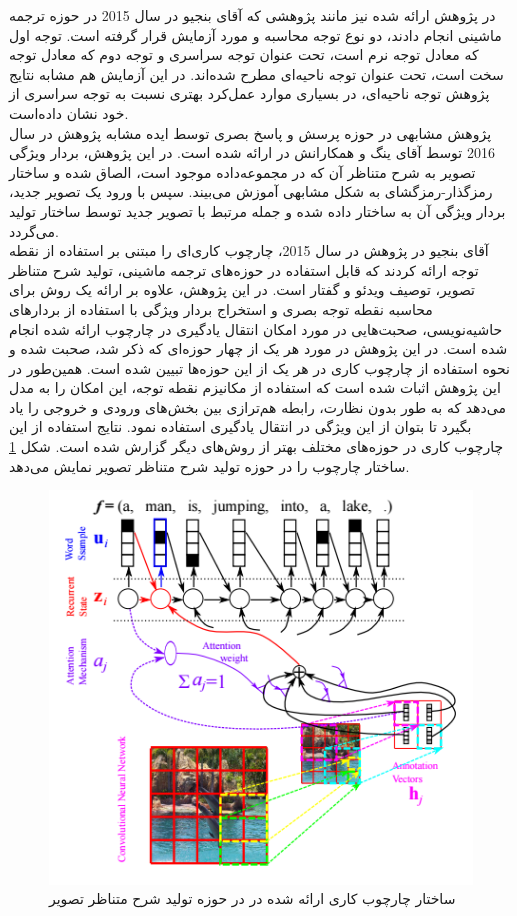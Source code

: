 در پژوهش ارائه شده نیز مانند پژوهشی که آقای بنجیو در سال 2015 در حوزه ترجمه ماشینی انجام دادند، دو نوع توجه محاسبه و مورد آزمایش قرار گرفته است. توجه اول که معادل توجه نرم است، تحت عنوان توجه سراسری و توجه دوم که معادل توجه سخت است، تحت عنوان توجه ناحیه‌ای مطرح شده‌اند. در این آزمایش هم مشابه نتایج پژوهش \cite{xu2015show} توجه ناحیه‌ای، در بسیاری موارد عمل‌کرد بهتری نسبت به توجه سراسری از خود نشان داده‌است.
\\
پژوهش مشابهی در حوزه پرسش و پاسخ بصری توسط ایده مشابه پژوهش \cite{luong2015effective} در سال 2016 توسط آقای ینگ و همکارانش در \cite{yang2016stacked} ارائه شده است. در این پژوهش، بردار ویژگی تصویر به شرح متناظر آن که در مجموعه‌داده موجود است، الصاق شده و ساختار رمزگذار-رمزگشای به شکل مشابهی آموزش می‌بیند. سپس با ورود یک تصویر جدید، بردار ویژگی آن به ساختار داده شده و جمله مرتبط با تصویر جدید توسط ساختار تولید می‌گردد.
\\
آقای بنجیو در پژوهش \cite{cho2015describing} در سال 2015، چارچوب کاری‌ای را مبتنی بر استفاده از نقطه توجه ارائه کردند که قابل استفاده در حوزه‌های ترجمه ماشینی، تولید شرح متناظر تصویر، توصیف ویدئو و گفتار است. در این پژوهش، علاوه بر ارائه یک روش برای محاسبه نقطه توجه بصری و استخراج بردار ویژگی با استفاده از بردارهای حاشیه‌نویسی، صحبت‌هایی در مورد امکان انتقال یادگیری در چارچوب ارائه شده انجام شده است. در این پژوهش در مورد هر یک از چهار حوزه‌ای که ذکر شد، صحبت شده و نحوه استفاده از چارچوب کاری در هر یک از این حوزه‌ها تبیین شده است. همین‌طور در این پژوهش اثبات شده است که استفاده از مکانیزم نقطه توجه، این امکان را به مدل می‌دهد که به طور بدون نظارت، رابطه هم‌ترازی بین بخش‌های ورودی و خروجی را یاد بگیرد تا بتوان از این ویژگی در انتقال یادگیری استفاده نمود. نتایج استفاده از این چارچوب کاری در حوزه‌های مختلف بهتر از روش‌های دیگر گزارش شده است. شکل \ref{fig:5-abedfw} ساختار چارچوب را در حوزه تولید شرح متناظر تصویر نمایش می‌دهد.

\begin{figure}[h]
	\centering
	\includegraphics[scale=0.6]{Imgs/abedfw.png}
	\caption{ساختار چارچوب کاری ارائه شده در \cite{cho2015describing} در حوزه تولید شرح متناظر تصویر}
	\label{fig:5-abedfw}
\end{figure}


